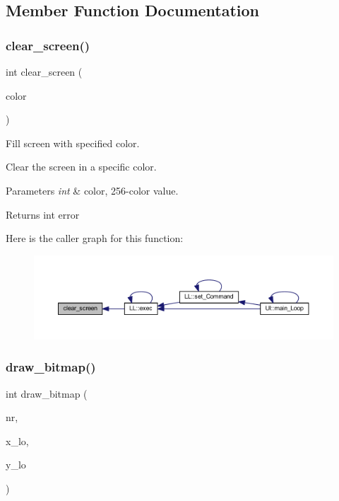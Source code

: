 \subsection{Member Function Documentation}
\mbox{\label{class_vgascreen_a5420000fe45606af438d6de37cb59fa4}} 
\subsubsection{\texorpdfstring{clear\+\_\+screen()}{clear\_screen()}}
{\footnotesize\ttfamily int clear\+\_\+screen (\begin{DoxyParamCaption}\item[{int}]{color }\end{DoxyParamCaption})}



Fill screen with specified color. 

Clear the screen in a specific color.


\begin{DoxyParams}{Parameters}
{\em int} & color, 256-\/color value. \\
\hline
\end{DoxyParams}
\begin{DoxyReturn}{Returns}
int error 
\end{DoxyReturn}
Here is the caller graph for this function\+:
\nopagebreak
\begin{figure}[H]
\begin{center}
\leavevmode
\includegraphics[width=350pt]{class_vgascreen_a5420000fe45606af438d6de37cb59fa4_icgraph}
\end{center}
\end{figure}
\mbox{\label{class_vgascreen_ad523b2dd47a6f2adde2d40cf1d809f27}} 
\subsubsection{\texorpdfstring{draw\+\_\+bitmap()}{draw\_bitmap()}}
{\footnotesize\ttfamily int draw\+\_\+bitmap (\begin{DoxyParamCaption}\item[{int}]{nr,  }\item[{int}]{x\+\_\+lo,  }\item[{int}]{y\+\_\+lo }\end{DoxyParamCaption})}



